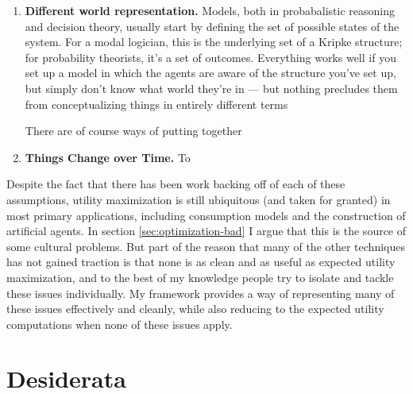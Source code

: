 \documentclass{article}
\begin{document}
\begin{enumerate}
		\item \textbf{Different world representation.} 
		Models, both in probabalistic reasoning and decision theory, usually start by defining the set of possible states of the system. For a modal logician, this is the underlying set of a Kripke structure; for probability theorists, it's a set of outcomes. Everything works well if you set up a model in which the agents are aware of the structure you've set up, but simply don't know what world they're in --- but nothing precludes them from conceptualizing things in entirely different terms
			
		There are of course ways of putting together
		
		
		\item \textbf{Things Change over Time.} To 
	\end{enumerate}	

	Despite the fact that there has been work backing off of each of these assumptions, utility maximization is still ubiquitous (and taken for granted) in most primary applications, including consumption models and the construction of artificial agents. In section \ref{sec:optimization-bad} I argue that this is the source of some cultural problems. But part of the reason that many of the other techniques has not gained traction is that none is as clean and as useful as expected utility maximization, and to the best of my knowledge people try to isolate and tackle these issues individually. My framework provides a way of representing many of these issues effectively and cleanly, while also reducing to the expected utility computations when none of these issues apply. 


	\section{Desiderata}
	
	
	
\end{document}
